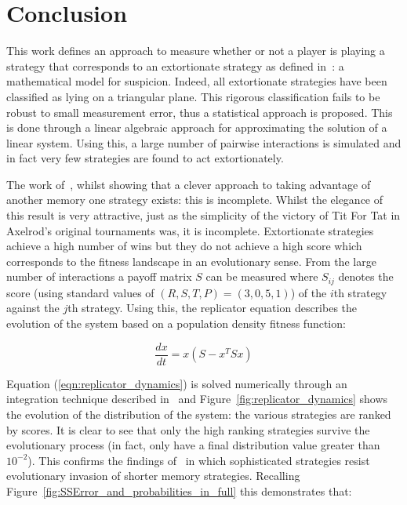 \documentclass[a4paper]{article}
\begin{document}
\section{Conclusion}\label{sec:conclusion}

This work defines an approach to measure whether or not a player is playing a
strategy that corresponds to an extortionate strategy as defined
in~\cite{Press2012}: a mathematical model for suspicion. Indeed, all
extortionate strategies have been classified as lying on a triangular plane.
This rigorous classification fails to be robust to small measurement error, thus
a statistical approach is proposed.
This is done through a linear algebraic approach for approximating the solution
of a linear system. Using this, a large number of pairwise interactions is
simulated and in fact very few strategies are found to act extortionately.

The work of~\cite{Press2012}, whilst showing that a clever approach to taking
advantage of another memory one strategy exists: this is incomplete. Whilst the
elegance of this result is very attractive, just as the simplicity of the
victory of Tit For Tat in Axelrod's original tournaments was, it is incomplete.
Extortionate strategies achieve a high number of wins but they do not
achieve a high score which corresponds to the fitness landscape in an
evolutionary sense. From the large number of interactions a payoff matrix \(S\)
can be measured where \(S_{ij}\) denotes the score (using standard values of
\((R, S, T, P) = (3, 0, 5, 1)\)) of the \(i\)th strategy
against the \(j\)th strategy. Using this, the replicator equation
describes the evolution of the system based on a population density fitness
function:

\begin{equation}\label{eqn:replicator_dynamics}
    \frac{dx}{dt} = x(S-x^TS x)
\end{equation}

Equation (\ref{eqn:replicator_dynamics}) is solved numerically through an
integration technique described in~\cite{Petzold1983} and
Figure~\ref{fig:replicator_dynamics} shows the evolution of the distribution of
the system: the various strategies are ranked by scores. It is clear to see that
only the high ranking strategies survive the evolutionary process (in fact,
only 
have a final distribution value greater than \(10 ^ {-2}\)). This confirms the
findings of~\cite{Moran1707} in which sophisticated strategies resist
evolutionary invasion of shorter memory strategies. Recalling
Figure~\ref{fig:SSError_and_probabilities_in_full} this demonstrates that:
\end{document}
